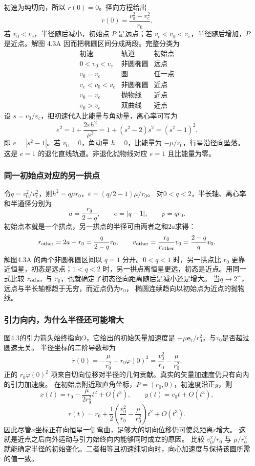\documentclass[UTF8,fontset=fandol,a4paper,11pt]{ctexart}
\newcommand{\vect}[1]{\bm{#1}}
\begin{document}
初速为纯切向，所以 $\dot r(0)=0$。径向方程给出
\[
\ddot r(0)=\frac{v_0^2-v_c^2}{r_0}.
\]
若 $v_0<v_c$，半径随后减小，初始点 $P$ 是远点；若 $v_c<v_0<v_e$，半径随后增加，$P$ 是近点。解图 4.3A 因而把椭圆区间分成两段。完整分类为
\[
\begin{array}{c|c|c}
\text{初速}&\text{轨道}&\text{初始点}\\\hline
0<v_0<v_c&\text{非圆椭圆}&\text{远点}\\
v_0=v_c&\text{圆}&\text{任一点}\\
v_c<v_0<v_e&\text{非圆椭圆}&\text{近点}\\
v_0=v_e&\text{抛物线}&\text{近点}\\
v_0>v_e&\text{双曲线}&\text{近点}
\end{array}
\]
设 $s=v_0/v_c$，把初速代入比能量与角动量，离心率可写为
\[
e^2=1+\frac{2\varepsilon h^2}{\mu^2}
=1+(s^2-2)s^2=(s^2-1)^2.
\]
即 $e=|s^2-1|$。若 $v_0=0$，角动量 $h=0$，比能量为 $-\mu/r_0$，行星沿径向坠落。这是 $e=1$ 的退化直线轨道。非退化抛物线对应 $e=1$ 且比能量为零。
\subsubsection*{同一初始点对应的另一拱点}
令$q=v_0^2/v_c^2$，则$h^2=q\mu r_0$，$\varepsilon=(q/2-1)\mu/r_0$。
对$0<q<2$，半长轴、离心率和半通径分别为
\[
a=\frac{r_0}{2-q},\qquad e=|q-1|,\qquad p=qr_0.
\]
初始点本就是一个拱点，另一拱点的半径可由两者之和$2a$求得：
\[
r_{\rm other}=2a-r_0=\frac{q}{2-q}r_0,
\qquad v_{\rm other}=\frac{r_0}{r_{\rm other}}v_0
=\frac{2-q}{q}v_0.
\]
解图4.3A 的两个非圆椭圆区间以 $q=1$ 分开。$0<q<1$ 时，另一拱点比 $r_0$ 更靠近恒星，初态是远点；$1<q<2$ 时，另一拱点离恒星更远，初态是近点。用同一式比较 $r_{\rm other}$ 与 $r_0$，也就确定了初态径向距离随后是减小还是增大。
当$q\to2^-$，远点与半长轴都趋于无穷，而近点仍为$r_0$，
椭圆连续趋向以初始点为近点的抛物线。

\subsubsection*{引力向内，为什么半径还可能增大}
图4.3的引力箭头始终指向$O$，它给出的初始矢量加速度是
$-\mu\vect e_r/r_0^2$，与$v_0$是否超过圆速无关。
半径坐标的二阶导数却为
\[
\ddot r(0)=-\frac\mu{r_0^2}+r_0\dot\varphi(0)^2
=\frac{v_0^2}{r_0}-\frac\mu{r_0^2}.
\]
正的 $r_0\dot\varphi(0)^2$ 项来自切向位移对半径的几何贡献。真实的矢量加速度仍只有向内的引力加速度。
在初始点附近取直角坐标，$P=(r_0,0)$，初速度沿正$y$，则
\[
x(t)=r_0-\frac{\mu}{2r_0^2}t^2+O(t^3),\qquad
y(t)=v_0t+O(t^3),
\]
\[
r(t)=r_0+\frac12\left(\frac{v_0^2}{r_0}-\frac\mu{r_0^2}\right)t^2+O(t^3).
\]
因此尽管$x$坐标正在向恒星一侧弯曲，足够大的切向位移仍可使总距离$r$增大。
这就是近点之后向外运动与引力始终向内能够同时成立的原因。
比较 $v_0^2/r_0$ 与 $\mu/r_0^2$ 就能确定半径的初始变化。二者相等且初速纯切向时，向心加速度与保持该圆所需的值一致。
\end{document}
